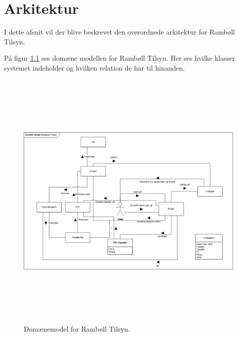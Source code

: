 \chapter{Arkitektur}
I dette afsnit vil der blive beskrevet den overordnede arkitektur for Rambøll Tilsyn.

På figur \ref{fig:Domain} ses domæne modellen for Rambøll Tilsyn. Her ses hvilke klasser systemet indeholder og hvilken relation de har til hinanden.

\begin{figure}[H] %
	\centering
	\includegraphics[height=13cm, width=17cm]{Arkitektur/Domainmodel}
	\caption{Domænemodel for Rambøll Tilsyn.}
	\label{fig:Domain}
\end{figure}
